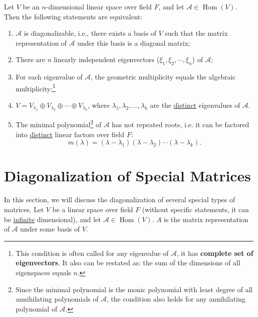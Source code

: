 \documentclass[11pt]{../../TexTemplate/elegantbook} %
\begin{document}
\begin{theorem}
    Let \( V \) be an \( n \)-dimensional linear space over field \( F \),
    and let \( \mathcal{A}\in \operatorname{Hom}(V) \).
    Then the following statements are equivalent:
    \begin{enumerate}
        \item \( \mathcal{A} \) is diagonalizable, i.e., there exists a basis of \( V \)
            such that the matrix representation of \( \mathcal{A} \) under this basis is a diagonal matrix;
        \item There are \( n \) linearly independent eigenvectors (\( \xi_{1}, \xi_{2}, \cdots, \xi_{n} \)) of \( \mathcal{A} \);
        \item For each eigenvalue of \( \mathcal{A} \), the geometric multiplicity equals the algebraic multiplicity;\footnote{
            This condition is often called for any eigenvalue of \( \mathcal{A} \), 
            it has \textbf{complete set of eigenvectors}.
            It also can be restated as: 
            the sum of the dimensions of all eigenspaces equals \( n \).
        }
        \item \( V = V_{\lambda_1} \oplus V_{\lambda_2} \oplus \cdots \oplus V_{\lambda_k} \),
            where \( \lambda_1, \lambda_2, \dots, \lambda_k \) are the \underline{distinct} eigenvalues of \( \mathcal{A} \).
        \item The minimal polynomial\footnote{
            Since the minimal polynomial is the monic polynomial with least degree 
            of all annihilating polynomials of \( \mathcal{A} \),
            the condition also holds for any annihilating polynomial of \( \mathcal{A} \).
        } of \( \mathcal{A} \) has not repeated roots, 
            i.e. it can be factored into \underline{distinct} linear factors over field \( F \):
            \[
            m(\lambda) = (\lambda - \lambda_1)(\lambda - \lambda_2) \cdots (\lambda - \lambda_k).
            \]
    \end{enumerate}
\end{theorem}

\section{Diagonalization of Special Matrices}
In this section, we will discuss the diagonalization of several special types of matrices.
Let \(V\) be a linear space over field \( F \) (without specific statements, it can be \underline{infinite} dimensional),
and let \( \mathcal{A}\in \operatorname{Hom}(V) \).
\(A\) is the matrix representation of \( \mathcal{A} \) under some basis of \( V \).
\end{document}
